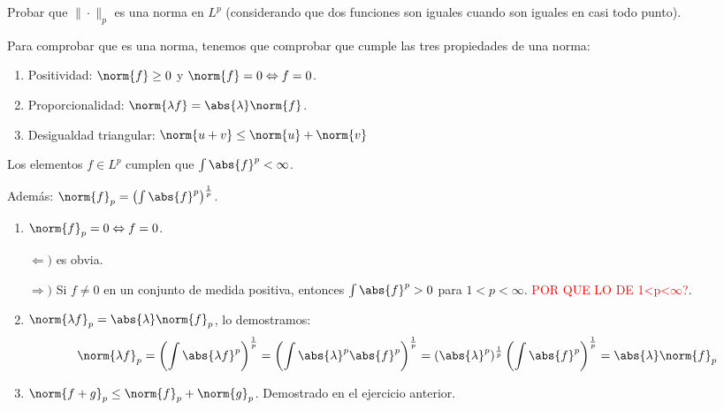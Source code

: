 
\begin{problem}[6] Probar que $\|\cdot\|_p$ es una norma en $L^p$ (considerando que dos funciones
son iguales
cuando son iguales en casi todo punto).
\solution

\begin{expla}
Para comprobar que es una norma, tenemos que comprobar que cumple las tres propiedades de una norma:
\begin{enumerate}
\item Positividad: $\norm{f}\geq 0$ y $\norm{f} = 0 \Leftrightarrow f=0$.
\item Proporcionalidad: $\norm{\lambda f} = \abs{\lambda}\norm{f}$.
\item Desigualdad triangular: $\norm{u+v} \leq \norm{u}+\norm{v}$     
\end{enumerate}

Los elementos $f \in L^p$ cumplen que $\int \abs{f}^p < \infty$. 

Además: $\norm{f}_p = \left( \int \abs{f}^p\right)^\frac{1}{p}$.
\end{expla}
\begin{enumerate}
\item  $\norm{f}_p = 0 \Leftrightarrow f=0$. 

$\Leftarrow)$ es obvia.

$\Rightarrow)$ Si $f \neq 0$ en un conjunto de medida positiva, entonces $\int \abs{f}^p >0$ para $1<p<\infty$. \textcolor{red}{POR QUE LO DE 1<p<$\infty$?}.
\item $\norm{\lambda f}_p=\abs{\lambda}\norm{f}_p$, lo demostramos: 
\[
\norm{\lambda f}_p =\left( \int \abs{\lambda f}^p \right)^{\frac{1}{p}} = \left( \int \abs{\lambda}^p \abs{f}^p\right)^{\frac{1}{p}} = (\abs{\lambda}^p)^{\frac{1}{p}} \left(\int \abs{f}^p\right)^{\frac{1}{p}} = \abs{\lambda} \norm{f}_p  
\]
\item $\norm{f+g}_p \leq \norm{f}_p+\norm{g}_p$.
Demostrado en el ejercicio anterior.
\end{enumerate}



\end{problem}



